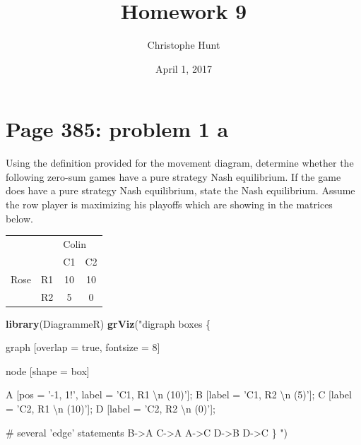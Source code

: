 \documentclass[]{article}
\title{Homework 9}
\author{Christophe Hunt}
\date{April 1, 2017}
\newenvironment{Shaded}{\begin{snugshade}}{\end{snugshade}}
\newcommand{\KeywordTok}[1]{\textcolor[rgb]{0.13,0.29,0.53}{\textbf{{#1}}}}
\newcommand{\CharTok}[1]{\textcolor[rgb]{0.31,0.60,0.02}{{#1}}}
\newcommand{\StringTok}[1]{\textcolor[rgb]{0.31,0.60,0.02}{{#1}}}
\newcommand{\NormalTok}[1]{{#1}}
\begin{document}
\maketitle

{
\setcounter{tocdepth}{2}
\tableofcontents
}
\newpage

\section{Page 385: problem 1 a}\label{page-385-problem-1-a}

Using the definition provided for the movement diagram, determine
whether the following zero-sum games have a pure strategy Nash
equilibrium. If the game does have a pure strategy Nash equilibrium,
state the Nash equilibrium. Assume the row player is maximizing his
playoffs which are showing in the matrices below.

\begin{table}[!h]
\centering
\begin{tabular}{lllc}
 &  & \multicolumn{2}{l}{Colin} \\ \cline{3-4}
 &  & C1 & \multicolumn{1}{l}{C2} \\ \hline
Rose & R1 & \multicolumn{1}{c}{10} & 10 \\
 & R2 & \multicolumn{1}{c}{5} & 0 \\ \hline
\end{tabular}
\end{table}

\begin{Shaded}
\begin{Highlighting}[]
\KeywordTok{library}\NormalTok{(DiagrammeR)}
\KeywordTok{grViz}\NormalTok{(}\StringTok{"digraph boxes \{}

\StringTok{  graph [overlap = true, fontsize = 8]}

\StringTok{  node [shape = box]}

\StringTok{  A [pos = '-1, 1!', label = 'C1, R1 }\CharTok{\textbackslash{}n}\StringTok{ (10)']; }
\StringTok{  B [label = 'C1, R2 }\CharTok{\textbackslash{}n}\StringTok{ (5)']; }
\StringTok{  C [label = 'C2, R1 }\CharTok{\textbackslash{}n}\StringTok{ (10)']; }
\StringTok{  D [label = 'C2, R2 }\CharTok{\textbackslash{}n}\StringTok{ (0)']; }

\StringTok{  # several 'edge' statements}
\StringTok{  B->A C->A A->C D->B D->C }
\StringTok{\}}
\StringTok{"}\NormalTok{)}
\end{Highlighting}
\end{Shaded}
\end{document}
